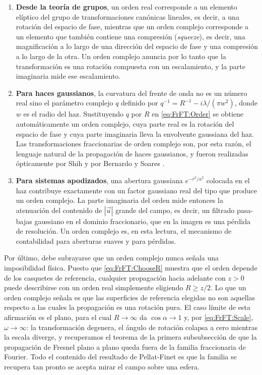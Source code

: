 			\begin{enumerate}
				\item \textbf{Desde la teoría de grupos}, un orden real corresponde a un elemento elíptico del grupo de transformaciones canónicas lineales, es decir, a una rotación del espacio de fase, mientras que un orden complejo corresponde a un elemento que también contiene una compresión (\textit{squeeze}), es decir, una magnificación a lo largo de una dirección del espacio de fase y una compresión a lo largo de la otra. Un orden complejo anuncia por lo tanto que la transformación es una rotación compuesta con un escalamiento, y la parte imaginaria mide ese escalamiento.
				\item \textbf{Para haces gaussianos}, la curvatura del frente de onda no es un número real sino el parámetro complejo $q$ definido por $q^{-1} = R^{-1} - i\lambda/(\pi w^{2})$, donde $w$ es el radio del haz. Sustituyendo $q$ por $R$ en \eqref{eq:FrFT:Order} se obtiene automáticamente un orden complejo, cuya parte real es la rotación del espacio de fase y cuya parte imaginaria lleva la envolvente gaussiana del haz. Las transformaciones fraccionarias de orden complejo son, por esta razón, el lenguaje natural de la propagación de haces gaussianos, y fueron realizadas ópticamente por Shih \citeyearpar{shih1995optical} y por Bernardo y Soares \citeyearpar{bernardo1996optical}.
				\item \textbf{Para sistemas apodizados}, una abertura gaussiana $e^{-r^{2}/a^{2}}$ colocada en el haz contribuye exactamente con un factor gaussiano real del tipo que produce un orden complejo. La parte imaginaria del orden mide entonces la atenuación del contenido de $|\vec{u}|$ grande del campo, es decir, un filtrado pasa-bajas gaussiano en el dominio fraccionario, que en la imagen es una pérdida de resolución. Un orden complejo es, en esta lectura, el mecanismo de contabilidad para aberturas suaves y para pérdidas.
			\end{enumerate}

			Por último, debe subrayarse que un orden complejo nunca señala una imposibilidad física. Puesto que \eqref{eq:FrFT:ChooseR} muestra que el orden depende de los casquetes de referencia, cualquier propagación hacia adelante con $z>0$ puede describirse con un orden real simplemente eligiendo $R \geq z/2$. Lo que un orden complejo señala es que las superficies de referencia elegidas no son aquellas respecto a las cuales la propagación es una rotación pura. El caso límite de esta afirmación es el plano, para el cual $R\to\infty$ da $\cos\alpha\to1$ y, por \eqref{eq:FrFT:Scale}, $\omega\to\infty$: la transformación degenera, el ángulo de rotación colapsa a cero mientras la escala diverge, y recuperamos el teorema de la primera subsubsección de que la propagación de Fresnel plano a plano queda fuera de la familia fraccionaria de Fourier. Todo el contenido del resultado de Pellat-Finet es que la familia se recupera tan pronto se acepta mirar el campo sobre una esfera.
